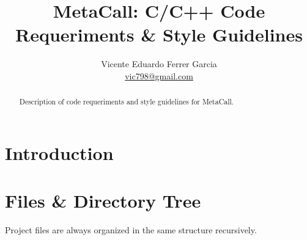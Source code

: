 \documentclass{article}
\begin{document}
% 

\title{MetaCall: C/C++ Code Requeriments \& Style Guidelines}

\author{Vicente Eduardo Ferrer Garcia \\ \href{mailto:vic798@gmail.com}{vic798@gmail.com}}

\maketitle

%

\begin{abstract}
\noindent
Description of code requeriments and style guidelines for MetaCall.
\end{abstract}

\setcounter{tocdepth}{2}
\tableofcontents
\listoffigures
\listoftables

\newpage

% 

\section{Introduction}




%

\newpage

% 

\section{Files \& Directory Tree}

Project files are always organized in the same structure recursively.
\end{document}
